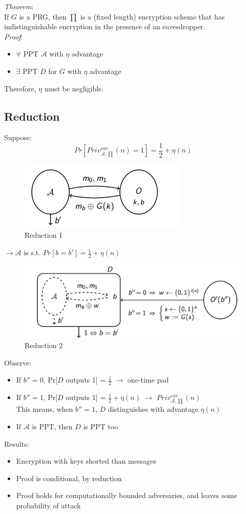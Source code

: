 \documentclass[12pt]{article}
\begin{document}
\emph{Theorem}:\\
If $G$ is a PRG, then $\prod$ is a (fixed length) encryption scheme that has indistinguishable encryption in the presence of an eavesdropper.\\
\emph{Proof}:
\begin{itemize}
\item $\forall$ PPT $\mathcal{A}$ with $\eta$ advantage
\item $\exists$ PPT $D$ for $G$ with $\eta$ advantage
\end{itemize}
Therefore, $\eta$ must be negligible.
\newpage
\subsection{Reduction}
Suppose:
\begin{equation}
Pr[Priv_{\mathcal{A},\prod}^{eav}(n)=1] = \frac{1}{2} + \eta(n)
\end{equation}
\begin{figure}[ht]
    \centering
    \includegraphics[width=8cm]{figures/f1.png}
    \caption{Reduction 1}
\end{figure}

$\rightarrow \mathcal{A}$ is s.t. $Pr[b=b']=  \frac{1}{2} + \eta(n)$ 

\begin{figure}[ht]
    \centering
    \includegraphics[width=12cm]{figures/f2.png}
    \caption{Reduction 2}
\end{figure}

Observe:
\begin{itemize}
\item If $b'' = 0$, Pr[$D$ outputs 1] = $\frac{1}{2}$ $\rightarrow$ one-time pad
\item If $b'' = 1$, Pr[$D$ outputs 1] = $\frac{1}{2} + \eta(n)$ $\rightarrow$ $Priv_{\mathcal{A},\prod}^{eav}(n)$\\
This means, when  $b'' = 1$, $D$ distinguishes with advantage $\eta(n)$
\item If $\mathcal{A}$ is PPT, then $D$ is PPT too
\end{itemize}
\newpage
Results:
\begin{itemize}
\item Encryption with keys shorted than messages
\item Proof is conditional, by reduction
\item Proof holds for computationally bounded adversaries, and leaves some probability of attack
\end{itemize}
\end{document}
